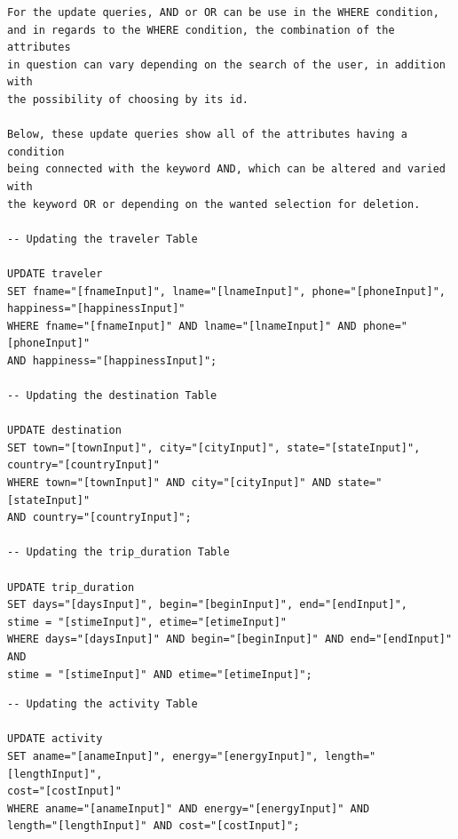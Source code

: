 \documentclass[letterpaper,10pt,onecolumn,compsoc]{IEEEtran}
\begin{document}
\begin{verbatim}
For the update queries, AND or OR can be use in the WHERE condition, 
and in regards to the WHERE condition, the combination of the attributes 
in question can vary depending on the search of the user, in addition with 
the possibility of choosing by its id. 

Below, these update queries show all of the attributes having a condition 
being connected with the keyword AND, which can be altered and varied with 
the keyword OR or depending on the wanted selection for deletion.

-- Updating the traveler Table

UPDATE traveler 
SET fname="[fnameInput]", lname="[lnameInput]", phone="[phoneInput]", 
happiness="[happinessInput]" 
WHERE fname="[fnameInput]" AND lname="[lnameInput]" AND phone="[phoneInput]" 
AND happiness="[happinessInput]";

-- Updating the destination Table

UPDATE destination 
SET town="[townInput]", city="[cityInput]", state="[stateInput]", 
country="[countryInput]" 
WHERE town="[townInput]" AND city="[cityInput]" AND state="[stateInput]" 
AND country="[countryInput]";

-- Updating the trip_duration Table

UPDATE trip_duration 
SET days="[daysInput]", begin="[beginInput]", end="[endInput]", 
stime = "[stimeInput]", etime="[etimeInput]" 
WHERE days="[daysInput]" AND begin="[beginInput]" AND end="[endInput]" AND 
stime = "[stimeInput]" AND etime="[etimeInput]";
\end{verbatim}

\newpage

\begin{verbatim}
-- Updating the activity Table

UPDATE activity 
SET aname="[anameInput]", energy="[energyInput]", length="[lengthInput]", 
cost="[costInput]" 
WHERE aname="[anameInput]" AND energy="[energyInput]" AND
length="[lengthInput]" AND cost="[costInput]";
\end{verbatim}




\end{document}
